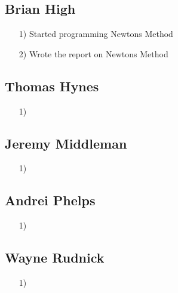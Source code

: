 \documentclass{article}
\begin{document}
\subsection*{Brian High}
\begin{itemize}
    \item[1)] Started programming Newtons Method
    \item[2)] Wrote the report on Newtons Method
\end{itemize}

\subsection*{Thomas Hynes}
\begin{itemize}
    \item[1)] 
\end{itemize}

\subsection*{Jeremy Middleman}
\begin{itemize}
    \item[1)] 
\end{itemize}

\subsection*{Andrei Phelps}
\begin{itemize}
    \item[1)] 
\end{itemize}

\subsection*{Wayne Rudnick}
\begin{itemize}
    \item[1)] 
\end{itemize}
\end{document}
